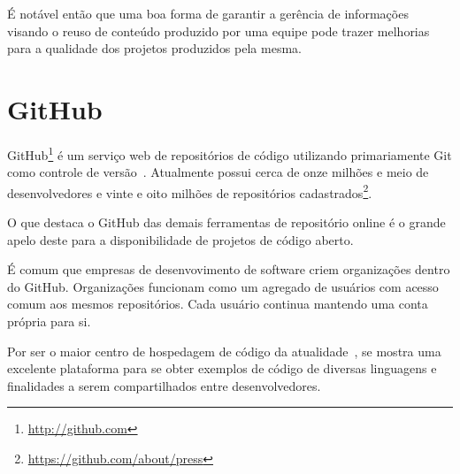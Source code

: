 É notável então que uma boa forma de garantir a gerência de informações visando o reuso de conteúdo produzido por uma equipe pode trazer melhorias para a qualidade dos projetos produzidos pela mesma.

\section{GitHub}

GitHub\footnote{\url{http://github.com}} é um serviço web de repositórios de código utilizando primariamente Git como controle de versão~\cite{Figueira2015}. Atualmente possui cerca de onze milhões e meio de desenvolvedores e vinte e oito milhões de repositórios cadastrados\footnote{\url{https://github.com/about/press}}.

O que destaca o GitHub das demais ferramentas de repositório online é o grande apelo deste para a disponibilidade de projetos de código aberto.

É comum que empresas de desenvovimento de software criem organizações dentro do GitHub. Organizações funcionam como um agregado de usuários com acesso comum aos mesmos repositórios. Cada usuário continua mantendo uma conta própria para si.

Por ser o maior centro de hospedagem de código da atualidade~\cite{Gousios2012}, se mostra uma excelente plataforma para se obter exemplos de código de diversas linguagens e finalidades a serem compartilhados entre desenvolvedores.
